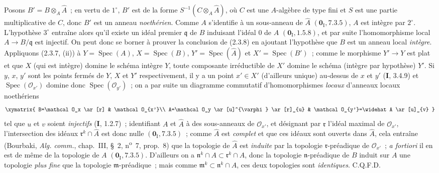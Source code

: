 Posons $B'=B\otimes_A\widehat A$~; en vertu de $1^\circ$, $B'$ est de la forme
$S^{-1}(C\otimes_A\widehat A)$, où $C$ est une $A$-algèbre de type fini et
$S$ est une partie multiplicative de $C$, donc $B'$ est un anneau \emph{noethérien}.
Comme $A$ s'identifie à un sous-anneau de $\widehat A$
$(\mathbf{0}_{\mathrm I},7.3.5)$, $A$ est intègre par $2^\circ$. L'hypothèse
$3^\circ$ entraîne alors qu'il existe un idéal premier $\mathfrak q$ de $B$
induisant l'idéal 0 de $A$ $(\mathbf{0}_{\mathrm I},1.5.8)$, et par suite
l'homomorphisme local $A\to B/\mathfrak q$ est injectif. On peut donc se borner
à prouver la conclusion de (2.3.8) en ajoutant l'hypothèse que $B$ est un
anneau local \emph{intègre}. Appliquons (2.3.7, (ii)) à
$Y=\operatorname{Spec}(A)$, $X=\operatorname{Spec}(B)$,
$Y'=\operatorname{Spec}(\widehat A)$ et $X'=\operatorname{Spec}(B')$~; comme
le morphisme $Y'\to Y$ est plat et que $X$
(qui est intègre) domine le schéma
intègre $Y$, toute composante irréductible de $X'$ domine le schéma (intègre
par hypothèse) $Y'$. Si $y$, $x$, $y'$ sont les points fermés de $Y$, $X$ et
$Y'$ respectivement, il y a un point $x'\in X'$ (d'ailleurs unique) au-dessus
de $x$ et $y'$ (\textbf{I}, 3.4.9) et $\operatorname{Spec}(\mathcal O_{x'})$ domine
donc $\operatorname{Spec}(\mathcal O_{y'})$~; on a par suite un diagramme
commutatif d'homomorphismes \emph{locaux} d'anneaux locaux noethériens
\[
\xymatrix{
  B=\mathcal O_x \ar[r] & \mathcal O_{x'}\\
  A=\mathcal O_y \ar[u]^{\varphi} \ar[r]_{u} &
  \mathcal O_{y'}=\widehat A \ar[u]_{v}
}
\]
tel que $u$ et $v$ soient \emph{injectifs} (\textbf{I}, 1.2.7)~; identifiant $A$ et
$\widehat A$ à des sous-anneaux de $\mathcal O_{x'}$, et désignant par
$\mathfrak r$ l'idéal maximal de $\mathcal O_{x'}$, l'intersection des idéaux
$\mathfrak r^k\cap\widehat A$ est donc nulle $(\mathbf{0}_{\mathrm I},7.3.5)$~;
comme $\widehat A$ est \emph{complet} et que ces idéaux sont ouverts dans
$\widehat A$, cela entraîne (Bourbaki, \emph{Alg. comm.}, chap.~III, \S~2,
n\textsuperscript{o}~7, prop.~8) que la topologie de $\widehat A$ est \emph{induite}
par la topologie $\mathfrak r$-préadique de $\mathcal O_{x'}$~; \emph{a
fortiori} il en est de même de la topologie de $A$
$(\mathbf{0}_{\mathrm I},7.3.5)$. D'ailleurs on a
$\mathfrak n^k\cap A\subset\mathfrak r^k\cap A$, donc la topologie
$\mathfrak n$-préadique de $B$ induit sur $A$ une topologie \emph{plus fine} que la
topologie $\mathfrak m$-préadique~; mais comme
$\mathfrak m^k\subset\mathfrak n^k\cap A$, ces deux topologies sont
\emph{identiques}. C.Q.F.D.

